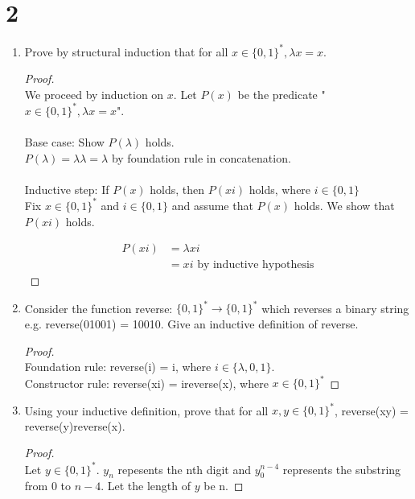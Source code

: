 \documentclass[11pt]{scrartcl}
\makeatletter
\newenvironment{Dequation}
{%
	\def\tagform@##1{%
	\maketag@@@{\makebox[0pt][r]{(\ignorespaces##1\unskip\@@italiccorr)}}}%
	\ignorespaces
}
{%
	\def\tagform@##1{\maketag@@@{(\ignorespaces##1\unskip\@@italiccorr)}}%
	\ignorespacesafterend
}
\makeatother
\begin{document}
\section{2}
\begin{enumerate}[label=\alph*.]
	\item{
			Prove by structural induction that for all $x \in \{0, 1\}^*, \lambda x = x$.
			\begin{proof}
			\-\\
			We proceed by induction on $x$. Let $P(x)$ be the predicate "$x \in \{0,1\}^*, \lambda x = x$".\\
			\-\\
			Base case: Show $P(\lambda)$ holds.\\
			$P(\lambda) = \lambda \lambda = \lambda$ by foundation rule in concatenation.\\
			\-\\
			Inductive step: If $P(x)$ holds, then $P(xi)$ holds, where $i \in \{0,1\}$\\
			Fix $x \in \{0, 1\}^*$ and $i \in \{0, 1\}$ and assume that $P(x)$ holds.
			We show that $P(xi)$ holds.
			\begin{Dequation}
				\begin{align*}
					P(xi) &= \lambda xi \\
						  &= xi \text { by inductive hypothesis} 
				\end{align*}
			\end{Dequation}
			\end{proof}
		}
	\item{
			Consider the function reverse: $\{0, 1\}^* \rightarrow \{0, 1\}^*$ which reverses a binary string\\
			e.g. reverse(01001) = 10010. Give an inductive definition of reverse.
			\begin{proof}
				\-\\
				Foundation rule: reverse(i) = i, where $i \in \{\lambda, 0, 1\}$. \\
				Constructor rule: reverse(xi) = ireverse(x), where $x \in \{0, 1\}^*$ 
			\end{proof}
		}
	\item{
		Using your inductive definition, prove that for all $x, y \in \{0, 1\}^*$, reverse(xy) = reverse(y)reverse(x).
		\begin{proof}
			\-\\
			Let $y \in \{0, 1\}^*$. $y_n$ repesents the nth digit and $y_0^{n-4}$ represents the substring from 0 to $n - 4$.
			Let the length of $y$ be n.
		\begin{Dequation}

\end{Dequation}
\end{proof}}
\end{enumerate}
\end{document}
